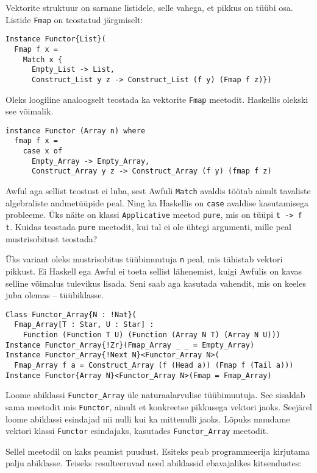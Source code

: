 \documentclass[12pt]{article}
\begin{document}
      Vektorite struktuur on sarnane listidele, selle vahega, et pikkus on tüübi osa. Listide \verb!Fmap! on teostatud järgmiselt:

      \begin{verbatim}Instance Functor{List}(
  Fmap f x =
    Match x {
      Empty_List -> List,
      Construct_List y z -> Construct_List (f y) (Fmap f z)})\end{verbatim}

      Oleks loogiline analoogselt teostada ka vektorite \verb!Fmap! meetodit. Haskellis olekski see võimalik.

      \begin{verbatim}instance Functor (Array n) where
  fmap f x =
    case x of
      Empty_Array -> Empty_Array,
      Construct_Array y z -> Construct_Array (f y) (fmap f z)\end{verbatim}

      Awful aga sellist teostust ei luba, sest Awfuli \verb!Match! avaldis töötab ainult tavaliste algebraliste andmetüüpide peal. Ning ka Haskellis on \verb!case! avaldise kasutamisega probleeme. Üks näite on klassi \verb!Applicative! meetod \verb!pure!, mis on tüüpi \verb!t -> f t!. Kuidas teostada \verb!pure! meetodit, kui tal ei ole ühtegi argumenti, mille peal mustrisobitust teostada?

      Üks variant oleks mustrisobitus tüübimuutuja \verb!n! peal, mis tähistab vektori pikkust. Ei Haskell ega Awful ei toeta sellist lähenemist, kuigi Awfulis on kavas selline võimalus tulevikus lisada. Seni saab aga kasutada vahendit, mis on keeles juba olemas -- tüübiklasse.

      \begin{verbatim}Class Functor_Array{N : !Nat}(
  Fmap_Array[T : Star, U : Star] :
    Function (Function T U) (Function (Array N T) (Array N U)))
Instance Functor_Array{!Zr}(Fmap_Array _ _ = Empty_Array)
Instance Functor_Array{!Next N}<Functor_Array N>(
  Fmap_Array f a = Construct_Array (f (Head a)) (Fmap f (Tail a)))
Instance Functor{Array N}<Functor_Array N>(Fmap = Fmap_Array)\end{verbatim}

      Loome abiklassi \verb!Functor_Array! üle naturaalarvulise tüübimuutuja. See sisaldab sama meetodit mis \verb!Functor!, ainult et konkreetse pikkusega vektori jaoks. Seejärel loome abiklassi esindajad nii nulli kui ka mittenulli jaoks. Lõpuks muudame vektori klassi \verb!Functor! esindajaks, kasutades \verb!Functor_Array! meetodit.

      Sellel meetodil on kaks peamist puudust. Esiteks peab programmeerija kirjutama palju abiklasse. Teiseks resulteeruvad need abiklassid ebavajalikes kitsendustes:
\end{document}
